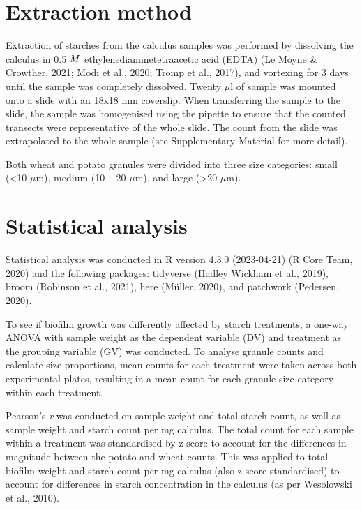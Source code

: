 \documentclass[
  letterpaper,
]{book}
\begin{document}
\hypertarget{extraction-method}{%
\section{Extraction method}\label{extraction-method}}

Extraction of starches from the calculus samples was performed by
dissolving the calculus in 0.5 \(\tiny{M}\) ethylenediaminetetraacetic
acid (EDTA) (Le Moyne \& Crowther, 2021; Modi et al., 2020; Tromp et
al., 2017), and vortexing for 3 days until the sample was completely
dissolved. Twenty \(\mu\)l of sample was mounted onto a slide with an
18x18 mm coverslip. When transferring the sample to the slide, the
sample was homogenised using the pipette to ensure that the counted
transects were representative of the whole slide. The count from the
slide was extrapolated to the whole sample (see Supplementary Material
for more detail).

Both wheat and potato granules were divided into three size categories:
small (\textless10 \(\mu\)m), medium (10 -- 20 \(\mu\)m), and large
(\textgreater20 \(\mu\)m).

\hypertarget{statistical-analysis}{%
\section{Statistical analysis}\label{statistical-analysis}}

Statistical analysis was conducted in R version 4.3.0 (2023-04-21) (R
Core Team, 2020) and the following packages: tidyverse (Hadley Wickham
et al., 2019), broom (Robinson et al., 2021), here (Müller, 2020), and
patchwork (Pedersen, 2020).

To see if biofilm growth was differently affected by starch treatments,
a one-way ANOVA with sample weight as the dependent variable (DV) and
treatment as the grouping variable (GV) was conducted. To analyse
granule counts and calculate size proportions, mean counts for each
treatment were taken across both experimental plates, resulting in a
mean count for each granule size category within each treatment.

Pearson's \emph{r} was conducted on sample weight and total starch
count, as well as sample weight and starch count per mg calculus. The
total count for each sample within a treatment was standardised by
z-score to account for the differences in magnitude between the potato
and wheat counts. This was applied to total biofilm weight and starch
count per mg calculus (also z-score standardised) to account for
differences in starch concentration in the calculus (as per Wesolowski
et al., 2010).
\end{document}
